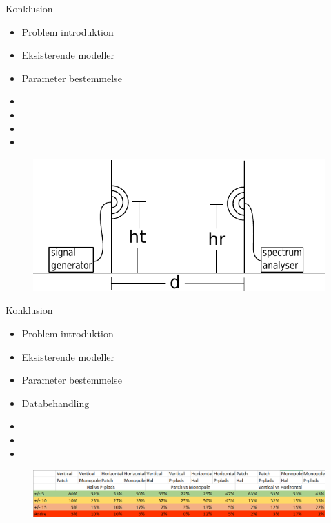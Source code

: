 \begin{frame}{Konklusion}
	\begin{minipage}{0.5\textwidth}
		\begin{itemize}
		\item Problem introduktion
		\item Eksisterende modeller
		\item Parameter bestemmelse
		\item[] 
		\item[] 
		\item[] 
		\item[] 
		\end{itemize}
	\end{minipage}%
	\begin{minipage}{0.5\textwidth}
		\begin{figure}[H]
			\centering
			\includegraphics[width=\columnwidth]{figures/setup.pdf}
		\end{figure}
	\end{minipage}%
\end{frame}


\begin{frame}{Konklusion}
	\begin{minipage}{0.5\textwidth}
		\begin{itemize}
		\item Problem introduktion
		\item Eksisterende modeller
		\item Parameter bestemmelse
		\item Databehandling
		\item[] 
		\item[] 
		\item[] 
		\end{itemize}
	\end{minipage}%
	\begin{minipage}{0.5\textwidth}
		\begin{figure}[H]
			\centering
			\includegraphics[width=\columnwidth]{figures/Data.png}
		\end{figure}
	\end{minipage}%
\end{frame}

